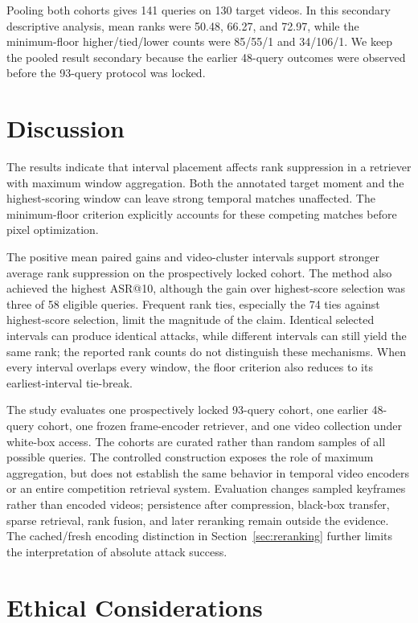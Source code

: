 \documentclass[runningheads]{llncs}
\begin{document}
Pooling both cohorts gives 141 queries on 130 target videos. In this secondary descriptive analysis, mean ranks were 50.48, 66.27, and 72.97, while the minimum-floor higher/tied/lower counts were 85/55/1 and 34/106/1. We keep the pooled result secondary because the earlier 48-query outcomes were observed before the 93-query protocol was locked.

\section{Discussion}

The results indicate that interval placement affects rank suppression in a retriever with maximum window aggregation. Both the annotated target moment and the highest-scoring window can leave strong temporal matches unaffected. The minimum-floor criterion explicitly accounts for these competing matches before pixel optimization.

The positive mean paired gains and video-cluster intervals support stronger average rank suppression on the prospectively locked cohort. The method also achieved the highest ASR@10, although the gain over highest-score selection was three of 58 eligible queries. Frequent rank ties, especially the 74 ties against highest-score selection, limit the magnitude of the claim. Identical selected intervals can produce identical attacks, while different intervals can still yield the same rank; the reported rank counts do not distinguish these mechanisms. When every interval overlaps every window, the floor criterion also reduces to its earliest-interval tie-break.

The study evaluates one prospectively locked 93-query cohort, one earlier 48-query cohort, one frozen frame-encoder retriever, and one video collection under white-box access. The cohorts are curated rather than random samples of all possible queries. The controlled construction exposes the role of maximum aggregation, but does not establish the same behavior in temporal video encoders or an entire competition retrieval system. Evaluation changes sampled keyframes rather than encoded videos; persistence after compression, black-box transfer, sparse retrieval, rank fusion, and later reranking remain outside the evidence. The cached/fresh encoding distinction in Section~\ref{sec:reranking} further limits the interpretation of absolute attack success.

\section{Ethical Considerations}
\end{document}

